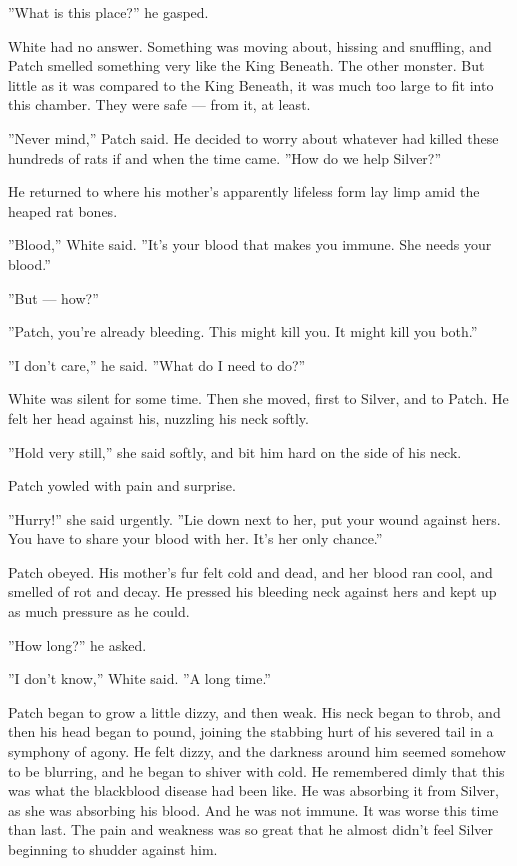\documentclass[12pt]{book}
\begin{document}
''What is this place?'' he gasped.

White had no answer. Something was moving about, hissing and
snuffling, and Patch smelled something very like the King Beneath. The
other monster. But little as it was compared to the King Beneath, it
was much too large to fit into this chamber. They were safe --- from
it, at least.

''Never mind,'' Patch said. He decided to worry about whatever had
killed these hundreds of rats if and when the time came. ''How do we
help Silver?''

He returned to where his mother's apparently lifeless form lay limp
amid the heaped rat bones.

''Blood,'' White said. ''It's your blood that makes you immune. She
needs your blood.''

''But --- how?''

''Patch, you're already bleeding. This might kill you. It might kill
you both.''

''I don't care,'' he said. ''What do I need to do?''

White was silent for some time. Then she moved, first to Silver, and
to Patch. He felt her head against his, nuzzling his neck softly.

''Hold very still,'' she said softly, and bit him hard on the side of
his neck.

Patch yowled with pain and surprise.

''Hurry!'' she said urgently. ''Lie down next to her, put your wound
against hers. You have to share your blood with her. It's her only
chance.''

Patch obeyed. His mother's fur felt cold and dead, and her blood ran
cool, and smelled of rot and decay. He pressed his bleeding neck
against hers and kept up as much pressure as he could.

''How long?'' he asked.

''I don't know,'' White said. ''A long time.''

Patch began to grow a little dizzy, and then weak. His neck began to
throb, and then his head began to pound, joining the stabbing hurt of
his severed tail in a symphony of agony. He felt dizzy, and the
darkness around him seemed somehow to be blurring, and he began to
shiver with cold. He remembered dimly that this was what the
blackblood disease had been like. He was absorbing it from Silver, as
she was absorbing his blood. And he was not immune. It was worse this
time than last. The pain and weakness was so great that he almost
didn't feel Silver beginning to shudder against him.
\end{document}
